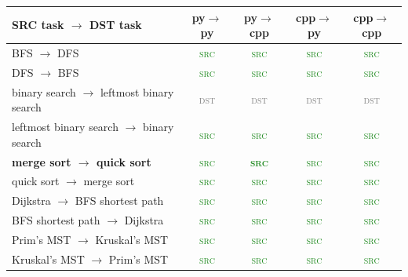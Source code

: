 \begin{table}[h!]
\centering
\small
\setlength{\tabcolsep}{4pt}
\begin{tabular}{lcccc}
\toprule
SRC task $\to$ DST task & py$\to$py & py$\to$cpp & cpp$\to$py & cpp$\to$cpp \\
\midrule
BFS $\to$ DFS & \textcolor{ForestGreen}{\textsc{src}} & \textcolor{ForestGreen}{\textsc{src}} & \textcolor{ForestGreen}{\textsc{src}} & \textcolor{ForestGreen}{\textsc{src}} \\
DFS $\to$ BFS & \textcolor{ForestGreen}{\textsc{src}} & \textcolor{ForestGreen}{\textsc{src}} & \textcolor{ForestGreen}{\textsc{src}} & \textcolor{ForestGreen}{\textsc{src}} \\
binary search $\to$ leftmost binary search & \textcolor{gray}{\textsc{dst}} & \textcolor{gray}{\textsc{dst}} & \textcolor{gray}{\textsc{dst}} & \textcolor{gray}{\textsc{dst}} \\
leftmost binary search $\to$ binary search & \textcolor{ForestGreen}{\textsc{src}} & \textcolor{ForestGreen}{\textsc{src}} & \textcolor{ForestGreen}{\textsc{src}} & \textcolor{ForestGreen}{\textsc{src}} \\
\textbf{merge sort $\to$ quick sort} & \textcolor{ForestGreen}{\textsc{src}} & \textcolor{ForestGreen}{\textbf{\textsc{src}}} & \textcolor{ForestGreen}{\textsc{src}} & \textcolor{ForestGreen}{\textsc{src}} \\
quick sort $\to$ merge sort & \textcolor{ForestGreen}{\textsc{src}} & \textcolor{ForestGreen}{\textsc{src}} & \textcolor{ForestGreen}{\textsc{src}} & \textcolor{ForestGreen}{\textsc{src}} \\
Dijkstra $\to$ BFS shortest path & \textcolor{ForestGreen}{\textsc{src}} & \textcolor{ForestGreen}{\textsc{src}} & \textcolor{ForestGreen}{\textsc{src}} & \textcolor{ForestGreen}{\textsc{src}} \\
BFS shortest path $\to$ Dijkstra & \textcolor{ForestGreen}{\textsc{src}} & \textcolor{ForestGreen}{\textsc{src}} & \textcolor{ForestGreen}{\textsc{src}} & \textcolor{ForestGreen}{\textsc{src}} \\
Prim's MST $\to$ Kruskal's MST & \textcolor{ForestGreen}{\textsc{src}} & \textcolor{ForestGreen}{\textsc{src}} & \textcolor{ForestGreen}{\textsc{src}} & \textcolor{ForestGreen}{\textsc{src}} \\
Kruskal's MST $\to$ Prim's MST & \textcolor{ForestGreen}{\textsc{src}} & \textcolor{ForestGreen}{\textsc{src}} & \textcolor{ForestGreen}{\textsc{src}} & \textcolor{ForestGreen}{\textsc{src}} \\

\end{tabular}
\end{table}
